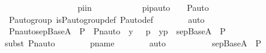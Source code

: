 \begin{isabellebody}
\ \ \isamarkupfalse%
\ {\isacharminus}{\kern0pt}\ \isanewline
\ \ \ \ \isamarkupfalse%
\ {\isasympi}\isanewline
\ \ \ \ \isamarkupfalse%
\ piin\ {\isacharcolon}{\kern0pt}\ {\isachardoublequoteopen}{\isasympi}\ {\isasymin}\ {\isasymG}{\isachardoublequoteclose}\isanewline
\ \ \ \ \isamarkupfalse%
\ \isamarkupfalse%
\ pipauto\ {\isacharcolon}{\kern0pt}\ {\isachardoublequoteopen}{\isasympi}\ {\isasymin}\ P{\isacharunderscore}{\kern0pt}auto{\isachardoublequoteclose}\ \isanewline
\ \ \ \ \ \ \isamarkupfalse%
\ {\isasymG}{\isacharunderscore}{\kern0pt}P{\isacharunderscore}{\kern0pt}auto{\isacharunderscore}{\kern0pt}group\ is{\isacharunderscore}{\kern0pt}P{\isacharunderscore}{\kern0pt}auto{\isacharunderscore}{\kern0pt}group{\isacharunderscore}{\kern0pt}def\ P{\isacharunderscore}{\kern0pt}auto{\isacharunderscore}{\kern0pt}def\isanewline
\ \ \ \ \ \ \isamarkupfalse%
\ auto\ \isanewline
\isanewline
\ \ \ \ \isamarkupfalse%
\ {\isachardoublequoteopen}Pn{\isacharunderscore}{\kern0pt}auto{\isacharparenleft}{\kern0pt}{\isasympi}{\isacharparenright}{\kern0pt}{\isacharbackquote}{\kern0pt}{\isacharparenleft}{\kern0pt}sep{\isacharunderscore}{\kern0pt}Base{\isacharparenleft}{\kern0pt}A{\isacharparenright}{\kern0pt}\ {\isasymtimes}\ P{\isacharparenright}{\kern0pt}\ {\isacharequal}{\kern0pt}\ {\isacharbraceleft}{\kern0pt}{\isasymlangle}Pn{\isacharunderscore}{\kern0pt}auto{\isacharparenleft}{\kern0pt}{\isasympi}{\isacharparenright}{\kern0pt}\ {\isacharbackquote}{\kern0pt}\ y{\isacharcomma}{\kern0pt}\ {\isasympi}\ {\isacharbackquote}{\kern0pt}\ p{\isasymrangle}\ {\isachardot}{\kern0pt}\ {\isasymlangle}y{\isacharcomma}{\kern0pt}p{\isasymrangle}\ {\isasymin}\ sep{\isacharunderscore}{\kern0pt}Base{\isacharparenleft}{\kern0pt}A{\isacharparenright}{\kern0pt}\ {\isasymtimes}\ P{\isacharbraceright}{\kern0pt}{\isachardoublequoteclose}\ \isanewline
\ \ \ \ \ \ \isamarkupfalse%
{\isacharparenleft}{\kern0pt}subst\ Pn{\isacharunderscore}{\kern0pt}auto{\isacharparenright}{\kern0pt}\isanewline
\ \ \ \ \ \ \isamarkupfalse%
\ pname\isanewline
\ \ \ \ \ \ \isamarkupfalse%
\ auto\ \isanewline
\ \ \ \ \isamarkupfalse%
\ \isamarkupfalse%
\ {\isachardoublequoteopen}{\isachardot}{\kern0pt}{\isachardot}{\kern0pt}{\isachardot}{\kern0pt}\ {\isacharequal}{\kern0pt}\ sep{\isacharunderscore}{\kern0pt}Base{\isacharparenleft}{\kern0pt}A{\isacharparenright}{\kern0pt}\ {\isasymtimes}\ P{\isachardoublequoteclose}\ \isanewline

\end{isabellebody}
